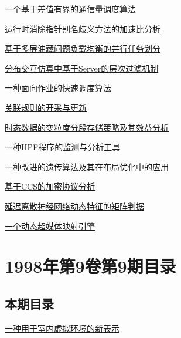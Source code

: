\documentclass[a4paper]{article}
\begin{document}
\href{http://www.jos.org.cn/ch/reader/download_pdf.aspx?file_no=19991006&year_id=1999&quarter_id=10&falg=1}{一个基于差值有界的通信量调度算法}

\href{http://www.jos.org.cn/ch/reader/download_pdf.aspx?file_no=19991007&year_id=1999&quarter_id=10&falg=1}{运行时消除指针别名歧义方法的加速比分析}

\href{http://www.jos.org.cn/ch/reader/download_pdf.aspx?file_no=19991008&year_id=1999&quarter_id=10&falg=1}{基于多层油藏问题负载均衡的并行任务划分}

\href{http://www.jos.org.cn/ch/reader/download_pdf.aspx?file_no=19991009&year_id=1999&quarter_id=10&falg=1}{分布交互仿真中基于Server的层次过滤机制}

\href{http://www.jos.org.cn/ch/reader/download_pdf.aspx?file_no=19991010&year_id=1999&quarter_id=10&falg=1}{一种面向作业的快速调度算法}

\href{http://www.jos.org.cn/ch/reader/download_pdf.aspx?file_no=19991011&year_id=1999&quarter_id=10&falg=1}{关联规则的开采与更新}

\href{http://www.jos.org.cn/ch/reader/download_pdf.aspx?file_no=19991012&year_id=1999&quarter_id=10&falg=1}{时态数据的变粒度分段存储策略及其效益分析}

\href{http://www.jos.org.cn/ch/reader/download_pdf.aspx?file_no=19991013&year_id=1999&quarter_id=10&falg=1}{一种HPF程序的监测与分析工具}

\href{http://www.jos.org.cn/ch/reader/download_pdf.aspx?file_no=19991014&year_id=1999&quarter_id=10&falg=1}{一种改进的遗传算法及其在布局优化中的应用}

\href{http://www.jos.org.cn/ch/reader/download_pdf.aspx?file_no=19991015&year_id=1999&quarter_id=10&falg=1}{基于CCS的加密协议分析}

\href{http://www.jos.org.cn/ch/reader/download_pdf.aspx?file_no=19991016&year_id=1999&quarter_id=10&falg=1}{延迟离散神经网络动态特征的矩阵判据}

\href{http://www.jos.org.cn/ch/reader/download_pdf.aspx?file_no=19991017&year_id=1999&quarter_id=10&falg=1}{一个动态超媒体映射引擎}


\section{\textbf{1998年第9卷第9期目录}}
\subsection{本期目录}
\href{http://www.jos.org.cn/ch/reader/download_pdf.aspx?file_no=19980901&year_id=1998&quarter_id=9&falg=1}{一种用于室内虚拟环境的新表示}
\end{document}
